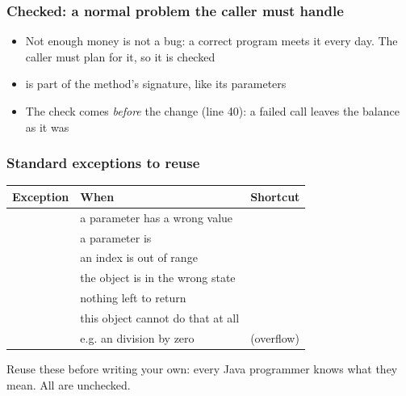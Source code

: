 \documentclass[aspectratio=169,10pt,compress]{beamer}
\begin{document}
\begin{frame}[t,fragile] \frametitle{Checked: a normal problem the caller must handle}

	\begin{itemize}\footnotesize
		\item Not enough money is not a bug: a correct program meets it every day. The caller must plan for it, so it is checked
		\item {} is part of the method's signature, like its parameters
		\item The check comes \emph{before} the change (line 40): a failed call leaves the balance as it was
	\end{itemize}
\end{frame}




\begin{frame}[t,fragile] \frametitle{Standard exceptions to reuse}


\begin{table}
		\footnotesize
		\begin{tabular}{@{}L{0.34\textwidth}L{0.30\textwidth}L{0.30\textwidth}@{}}
			\toprule
			\textbf{Exception} & \textbf{When} & \textbf{Shortcut} \\
			\midrule
			       & a parameter has a wrong value       & \\
			           & a parameter is           &  \\
			      & an index is out of range             &  \\
			          & the object is in the wrong state     & \\
			         & nothing left to return               & \\
			  & this object cannot do that at all    & \\
			            & e.g. an  division by zero &  (overflow) \\
			\bottomrule
		\end{tabular}
\end{table}%


	\vspace{0.3em}
	\small Reuse these before writing your own: every Java programmer knows what they mean. All are unchecked.
\end{frame}
\end{document}
